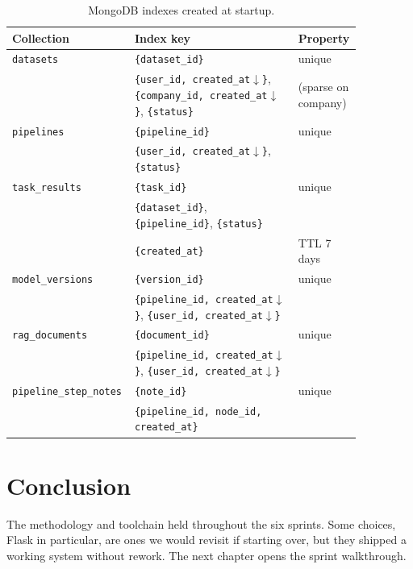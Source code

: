 \documentclass[12pt, a4paper, oneside]{report}
\begin{document}
\begin{table}[H]
\centering
\caption{MongoDB indexes created at startup.}
\label{tab:mongo_indexes}
\begin{tabular}{|p{0.24\linewidth}|L{0.46\linewidth}|p{0.16\linewidth}|}
\hline
\textbf{Collection} & \textbf{Index key} & \textbf{Property} \\
\hline
\texttt{datasets} & \texttt{\{dataset\_id\}} & unique \\ \hline
 & \texttt{\{user\_id, created\_at$\downarrow$\}}, \texttt{\{company\_id, created\_at$\downarrow$\}}, \texttt{\{status\}} & (sparse on company) \\ \hline
\texttt{pipelines} & \texttt{\{pipeline\_id\}} & unique \\ \hline
 & \texttt{\{user\_id, created\_at$\downarrow$\}}, \texttt{\{status\}} & \\ \hline
\texttt{task\_results} & \texttt{\{task\_id\}} & unique \\ \hline
 & \texttt{\{dataset\_id\}}, \texttt{\{pipeline\_id\}}, \texttt{\{status\}} & \\ \hline
 & \texttt{\{created\_at\}} & TTL 7 days \\ \hline
\texttt{model\_versions} & \texttt{\{version\_id\}} & unique \\ \hline
 & \texttt{\{pipeline\_id, created\_at$\downarrow$\}}, \texttt{\{user\_id, created\_at$\downarrow$\}} & \\ \hline
\texttt{rag\_documents} & \texttt{\{document\_id\}} & unique \\ \hline
 & \texttt{\{pipeline\_id, created\_at$\downarrow$\}}, \texttt{\{user\_id, created\_at$\downarrow$\}} & \\ \hline
\texttt{pipeline\_step\_notes} & \texttt{\{note\_id\}} & unique \\ \hline
 & \texttt{\{pipeline\_id, node\_id, created\_at\}} & \\
\hline
\end{tabular}
\end{table}

\section*{Conclusion}

The methodology and toolchain held throughout the six sprints. Some
choices, Flask in particular, are ones we would revisit if
starting over, but they shipped a working system without rework. The
next chapter opens the sprint walkthrough.
\end{document}
